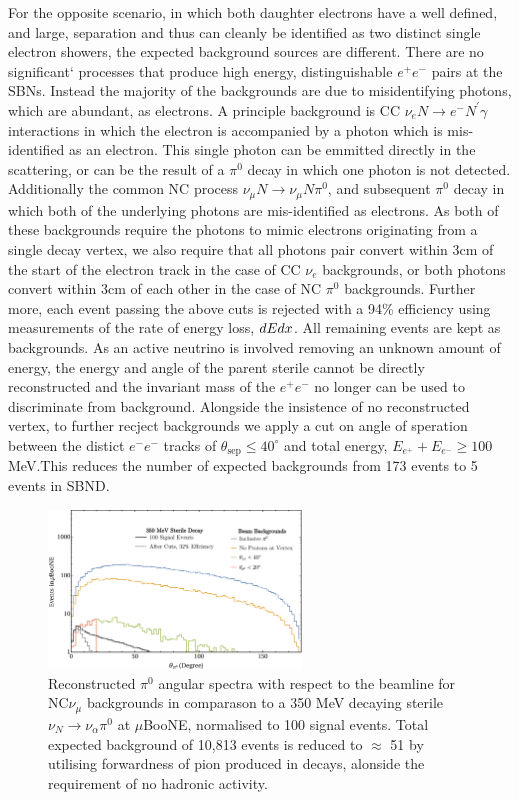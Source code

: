 \documentclass[11pt, a4paper]{article}
\begin{document}
For the opposite scenario, in which both daughter electrons have a well defined, and large, separation and thus can cleanly be identified as two distinct single electron showers, the expected background sources are different. There are no significant` processes that produce high energy, distinguishable $e^+e^-$ pairs at the SBNs.  Instead the majority of the backgrounds are due to misidentifying photons, which are abundant, as electrons. A principle background is CC $\nu_e N \rightarrow e^- N^\prime \gamma$ interactions in which the electron is accompanied by a photon which is mis-identified as an electron. This single photon can be emmitted directly in the scattering, or can be the result of a $\pi^0$ decay in which one photon is not detected. Additionally the common NC  process $\nu_\mu N \rightarrow \nu_\mu N \pi^0$, and subsequent $\pi^0$ decay in which both of the underlying photons are mis-identified as electrons. As both of these backgrounds require the photons to mimic electrons originating from a single decay vertex, we also require that all photons pair convert within 3cm of the start of the electron track in the case of CC $\nu_e$ backgrounds, or both photons convert within 3cm of each other in the case of NC $\pi^0$ backgrounds. Further more, each event passing the above cuts is rejected with a 94\% efficiency using measurements of the rate of energy loss, $dE\/dx$. All remaining events are kept as backgrounds. As an active neutrino is involved removing an unknown amount of energy, the energy and angle of the parent sterile cannot be directly reconstructed and the invariant mass of the $e^+ e^-$ no longer can be used to discriminate from background. Alongside the insistence of no reconstructed vertex, to further recject backgrounds we apply a cut on angle of speration between the distict $e^-e^-$ tracks of $\theta_\text{sep}\leq 40 ^\circ$ and total energy, $E_{e^+}+E_{e^-} \geq 100$ MeV.This reduces the number of expected backgrounds from 173 events to 5 events in SBND. 

\begin{figure}[h]
\center
\includegraphics[width=0.6\textwidth,clip,trim=0 0 0 0]{figures/nu_pi0_cutflow.pdf}
\caption{\label{fig:nu_pi0_cutflow} Reconstructed $\pi^0$ angular spectra with respect to the beamline for NC$\nu_\mu$ backgrounds in comparason to a 350 MeV decaying sterile $\nu_N \rightarrow \nu_\alpha \pi^0$ at $\mu$BooNE, normalised to 100 signal events. Total expected background of 10,813 events is reduced to $\approx$ 51 by utilising forwardness of pion produced in decays, alonside the requirement of no hadronic activity. }

\end{figure}
\end{document}
